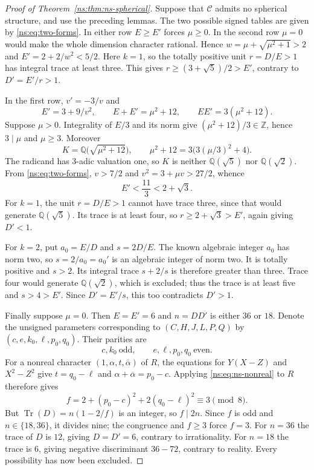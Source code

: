 \documentclass[11pt,a4paper]{article}
\theoremstyle{definition}\newtheorem{definition}[theorem]{Definition}
\theoremstyle{remark}\newtheorem{remark}[theorem]{Remark}
\newcommand{\C}{\mathcal C}
\newcommand{\Q}{\mathbb Q}
\newcommand{\ZZ}{\mathbb Z}
\numberwithin{equation}{section}
\begin{document}
\begin{proof}[Proof of Theorem~\ref{ns:thm:ns-spherical}]
Suppose that $\C$ admits no spherical structure, and use the preceding
lemmas. The two possible signed tables are given by
\eqref{ns:eq:two-forms}. In either row $E\ge E'$ forces $\mu\ge0$.
In the second row $\mu=0$ would make the whole dimension character
rational. Hence $w=\mu+\sqrt{\mu^2+1}>2$ and
$E'=2+2/w^2<5/2$. Here $k=1$, so the totally positive unit
$r=D/E>1$ has integral trace at least three. This gives
$r\ge(3+\sqrt5)/2>E'$, contrary to $D'=E'/r>1$.

In the first row, $v'=-3/v$ and
\begin{equation}\label{ns:eq:ns-ng-norm}
 E'=3+9/v^2,\qquad E+E'=\mu^2+12,\qquad EE'=3(\mu^2+12).
\end{equation}
Suppose $\mu>0$. Integrality of $E/3$ and its norm give
$(\mu^2+12)/3\in\ZZ$, hence $3\mid\mu$ and $\mu\geq3$.
Moreover
\[
 K=\Q\bigl(\sqrt{\mu^2+12}\bigr),\qquad
 \mu^2+12=3\bigl(3(\mu/3)^2+4\bigr).
\]
The radicand has $3$-adic valuation one, so $K$ is neither
$\Q(\sqrt5)$ nor $\Q(\sqrt2)$.
From \eqref{ns:eq:two-forms}, $v>7/2$ and
$v^2=3+\mu v>27/2$, whence
\begin{equation}\label{ns:eq:ns-small-conjugate}
 E'<\frac{11}{3}<2+\sqrt3.
\end{equation}
For $k=1$, the unit $r=D/E>1$ cannot have trace three, since that
would generate $\Q(\sqrt5)$. Its trace is at least four,
so $r\geq2+\sqrt3>E'$, again giving $D'<1$.

For $k=2$, put $a_0=E/D$ and $s=2D/E$. The known algebraic integer
$a_0$ has norm two, so $s=2/a_0=a_0'$ is an algebraic integer of
norm two. It is totally positive and $s>2$. Its integral trace
$s+2/s$ is therefore greater than three. Trace four would generate
$\Q(\sqrt2)$, which is excluded; thus the trace is at least
five and $s>4>E'$. Since $D'=E'/s$, this too contradicts $D'>1$.

Finally suppose $\mu=0$. Then $E=E'=6$ and $n=DD'$ is either
$36$ or $18$. Denote the unsigned parameters corresponding to
$(C,H,J,L,P,Q)$ by $(c,e,k_0,\ell,p_0,q_0)$. Their parities are
\[
 c,k_0\ \text{odd},\qquad e,\ell,p_0,q_0\ \text{even}.
\]
For a nonreal character $(1,\alpha,t,\overline\alpha)$ of $R$,
the equations for $Y(X-Z)$ and $X^2-Z^2$ give
$t=q_0-\ell$ and $\alpha+\overline\alpha=p_0-c$.
Applying \eqref{ns:eq:ns-nonreal} to $R$ therefore gives
\[
 f=2+(p_0-c)^2+2(q_0-\ell)^2\equiv3\pmod8.
\]
But $\operatorname{Tr}(D)=n(1-2/f)$ is an integer, so $f\mid2n$.
Since $f$ is odd and $n\in\{18,36\}$, it divides nine; the
congruence and $f\geq3$ force $f=3$. For $n=36$ the trace of $D$
is $12$, giving $D=D'=6$, contrary to irrationality. For $n=18$
the trace is $6$, giving negative discriminant $36-72$,
contrary to reality. Every possibility has now been excluded.
\end{proof}
\end{document}
